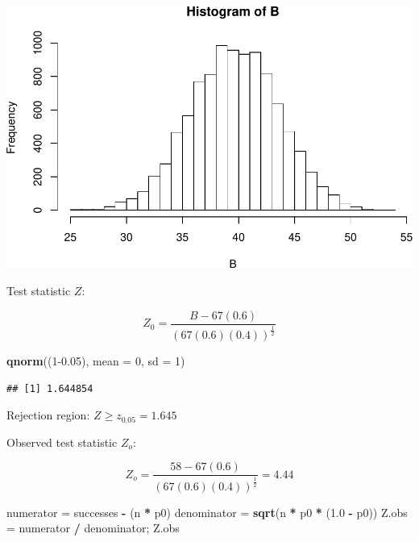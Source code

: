 \documentclass[]{article}
\newenvironment{Shaded}{\begin{snugshade}}{\end{snugshade}}
\newcommand{\DataTypeTok}[1]{\textcolor[rgb]{0.13,0.29,0.53}{#1}}
\newcommand{\DecValTok}[1]{\textcolor[rgb]{0.00,0.00,0.81}{#1}}
\newcommand{\FloatTok}[1]{\textcolor[rgb]{0.00,0.00,0.81}{#1}}
\newcommand{\KeywordTok}[1]{\textcolor[rgb]{0.13,0.29,0.53}{\textbf{#1}}}
\newcommand{\NormalTok}[1]{#1}
\newcommand{\OperatorTok}[1]{\textcolor[rgb]{0.81,0.36,0.00}{\textbf{#1}}}
\newcommand{\StringTok}[1]{\textcolor[rgb]{0.31,0.60,0.02}{#1}}
\begin{document}
\includegraphics{homework_3_files/figure-latex/unnamed-chunk-3-1.pdf}

Test statistic \(Z\):

\[
    Z_0 = \frac{B - 67(0.6)}{(67(0.6)(0.4))^{\frac{1}{2}}}
\]

\begin{Shaded}
\begin{Highlighting}[]
\KeywordTok{qnorm}\NormalTok{((}\DecValTok{1}\FloatTok{-0.05}\NormalTok{), }\DataTypeTok{mean =} \DecValTok{0}\NormalTok{, }\DataTypeTok{sd =} \DecValTok{1}\NormalTok{)}
\end{Highlighting}
\end{Shaded}

\begin{verbatim}
## [1] 1.644854
\end{verbatim}

Rejection region: \(Z \geq z_{0.05} = 1.645\)

Observed test statistic \(Z_o\):

\[
    Z_o = \frac{58 - 67(0.6)}{(67(0.6)(0.4))^{\frac{1}{2}}} = 4.44
\]

\begin{Shaded}
\begin{Highlighting}[]
\NormalTok{numerator =}\StringTok{ }\NormalTok{successes }\OperatorTok{-}\StringTok{ }\NormalTok{(n }\OperatorTok{*}\StringTok{ }\NormalTok{p0)}
\NormalTok{denominator =}\StringTok{ }\KeywordTok{sqrt}\NormalTok{(n }\OperatorTok{*}\StringTok{ }\NormalTok{p0 }\OperatorTok{*}\StringTok{ }\NormalTok{(}\FloatTok{1.0} \OperatorTok{-}\StringTok{ }\NormalTok{p0))}
\NormalTok{Z.obs =}\StringTok{ }\NormalTok{numerator }\OperatorTok{/}\StringTok{ }\NormalTok{denominator; Z.obs}
\end{Highlighting}
\end{Shaded}
\end{document}

